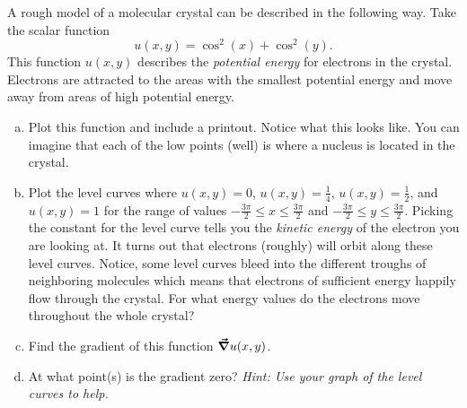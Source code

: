 \documentclass[12pt]{article} %
\begin{document}
\begin{problem}
A rough model of a molecular crystal can be described in the following way. Take the scalar function
\[
u(x,y)=\cos^2(x)+\cos^2(y).
\]
This function $u(x,y)$ describes the \emph{potential energy} for electrons in the crystal. Electrons are attracted to the areas with the smallest potential energy and move away from areas of high potential energy.
\begin{enumerate}[(a)]
    \item Plot this function and include a printout.  Notice what this looks like.  You can imagine that each of the low points (well) is where a nucleus is located in the crystal.
    \item Plot the level curves where $u(x,y)=0$, $u(x,y)=\frac{1}{4}$, $u(x,y)=\frac{1}{2}$, and $u(x,y)=1$ for the range of values $-\frac{3\pi}{2}\leq x \leq \frac{3\pi}{2}$ and $-\frac{3\pi}{2}\leq y \leq \frac{3\pi}{2}$. Picking the constant for the level curve tells you the \emph{kinetic energy} of the electron you are looking at.  It turns out that electrons (roughly) will orbit along these level curves.  Notice, some level curves bleed into the different troughs of neighboring molecules which means that electrons of sufficient energy happily flow through the crystal. For what energy values do the electrons move throughout the whole crystal?
    \item Find the gradient of this function $\boldsymbol{\vec{\nabla}} u(x,y)$.
    \item At what point(s) is the gradient zero? \emph{Hint: Use your graph of the level curves to help.}
    \end{enumerate}
\end{problem}
\end{document}
